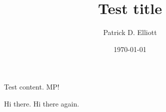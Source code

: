 \documentclass[nofonts,nobib]{tufte-handout}
\title{Test title}
\author{Patrick D. Elliott}
\date{\today}
\begin{document}


\maketitle

Test content. \ac{MP!}

Hi there. Hi there again.

\printbibliography
\end{document}
